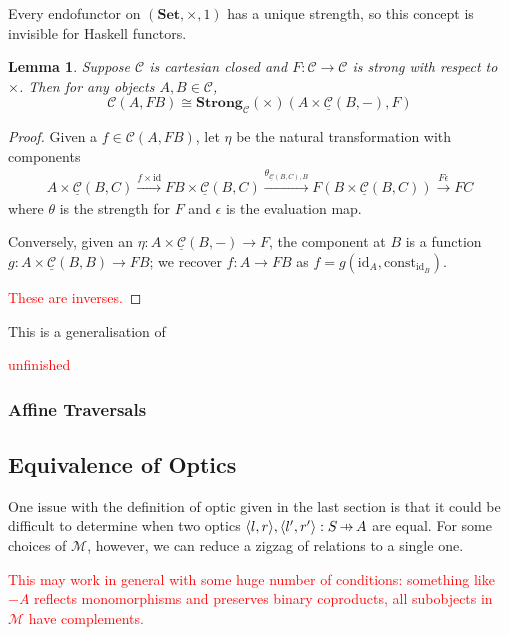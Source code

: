 \documentclass[11pt,a4paper]{article}
\theoremstyle{plain}
\newtheorem{lemma}[theorem]{Lemma}
\theoremstyle{definition}
\newcommand{\C}{\mathscr{C}}
\newcommand{\homC}{\underline{\C}}
\newcommand{\M}{\mathscr{M}}
\newcommand{\Set}{\mathbf{Set}}
\newcommand{\Strong}{\mathbf{Strong}}
\newcommand{\id}{\mathrm{id}}
\newcommand{\const}{\mathrm{const}}
\newcommand{\hto}{\ensuremath{\,\mathaccent\shortmid\rightarrow\,}}
\newcommand{\todo}[1]{\textcolor{red}{\small #1}}
\begin{document}
Every endofunctor on $(\Set, \times, 1)$ has a unique strength, so this concept is invisible for Haskell functors.

\begin{lemma}
Suppose $\C$ is cartesian closed and $F : \C \to \C$ is strong with respect to $\times$. Then for any objects $A, B \in \C$, \[\C(A, FB) \cong \Strong_\C(\times)(A \times \homC(B, -), F)\]
\end{lemma}
\begin{proof}
Given a $f \in \C(A, FB)$, let $\eta$ be the natural transformation with components
\begin{align*}
A \times \homC(B, C) \xrightarrow{f \times \id} FB \times \homC(B, C) \xrightarrow{\theta_{\homC(B, C), B}}  F(B \times \homC(B, C)) \xrightarrow{F\epsilon} FC
\end{align*}
where $\theta$ is the strength for $F$ and $\epsilon$ is the evaluation map.

Conversely, given an $\eta : A \times \homC(B, -) \to F$, the component at $B$ is a function $g : A \times \homC(B, B) \to FB$; we recover $f : A \to FB$ as $f = g (\id_A, \const_{\id_B})$.

\todo{These are inverses.}
\end{proof}

This is a generalisation of \cite[Proposition 2.2]{SecondOrderFunctionals}

\todo{unfinished}

\subsubsection{Affine Traversals}

\subsection{Equivalence of Optics}

One issue with the definition of optic given in the last section is that it could be difficult to determine when two optics $\langle l, r \rangle, \langle l', r' \rangle : S \hto A$ are equal. For some choices of $\M$, however, we can reduce a zigzag of relations to a single one.

\todo{This may work in general with some huge number of conditions: something like $-A$ reflects monomorphisms and preserves binary coproducts, all subobjects in $\M$ have complements.}
\end{document}
